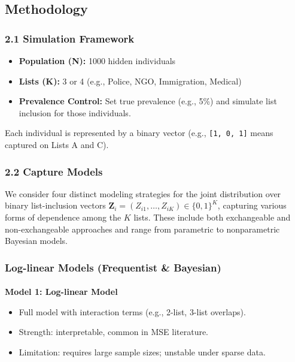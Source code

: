 \documentclass[
  12pt,
]{article}
\makeatletter
\let\oldparagraph\paragraph
\renewcommand{\paragraph}{
    \@ifstar
      \xxxParagraphStar
      \xxxParagraphNoStar
  }
\newcommand{\xxxParagraphStar}[1]{\oldparagraph*{#1}\mbox{}}
\newcommand{\xxxParagraphNoStar}[1]{\oldparagraph{#1}\mbox{}}
\providecommand{\tightlist}{%
  \setlength{\itemsep}{0pt}\setlength{\parskip}{0pt}}\usepackage{longtable,booktabs,array}
\theoremstyle{plain}
\theoremstyle{definition}
\makeatother
\begin{document}
\subsection{Methodology}\label{methodology}

\subsubsection{\texorpdfstring{\textbf{2.1 Simulation
Framework}}{2.1 Simulation Framework}}\label{simulation-framework}

\begin{itemize}
\tightlist
\item
  \textbf{Population (N):} 1000 hidden individuals
\item
  \textbf{Lists (K):} 3 or 4 (e.g., Police, NGO, Immigration, Medical)
\item
  \textbf{Prevalence Control:} Set true prevalence (e.g., 5\%) and
  simulate list inclusion for those individuals.
\end{itemize}

Each individual is represented by a binary vector (e.g.,
\texttt{{[}1,\ 0,\ 1{]}} means captured on Lists A and C).

\subsubsection{\texorpdfstring{\textbf{2.2 Capture
Models}}{2.2 Capture Models}}\label{capture-models}

We consider four distinct modeling strategies for the joint distribution
over binary list-inclusion vectors
\(\mathbf{Z}_i = (Z_{i1}, \ldots, Z_{iK}) \in \{0,1\}^K\), capturing
various forms of dependence among the \(K\) lists. These include both
exchangeable and non-exchangeable approaches and range from parametric
to nonparametric Bayesian models.

\subsubsection{Log-linear Models (Frequentist \&
Bayesian)}\label{log-linear-models-frequentist-bayesian}

\paragraph{\texorpdfstring{\textbf{Model 1: Log-linear
Model}}{Model 1: Log-linear Model}}\label{model-1-log-linear-model}

\begin{itemize}
\tightlist
\item
  Full model with interaction terms (e.g., 2-list, 3-list overlaps).
\item
  Strength: interpretable, common in MSE literature.
\item
  Limitation: requires large sample sizes; unstable under sparse data.
\end{itemize}
\end{document}
